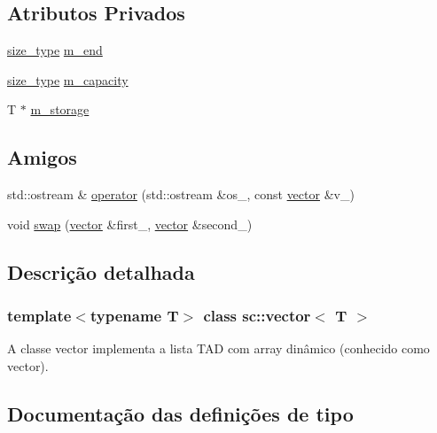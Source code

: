\subsection*{Atributos Privados}
\begin{DoxyCompactItemize}
\item 
\hyperlink{classsc_1_1vector_a48bf37ba1a6d0c13504414d86e27c399}{size\+\_\+type} \hyperlink{classsc_1_1vector_a6975f68db056a83f00912e9f986ca084}{m\+\_\+end}
\item 
\hyperlink{classsc_1_1vector_a48bf37ba1a6d0c13504414d86e27c399}{size\+\_\+type} \hyperlink{classsc_1_1vector_a566372683113653e90132001ddec8baa}{m\+\_\+capacity}
\item 
T $\ast$ \hyperlink{classsc_1_1vector_a1703231d2a20b42fd2814962310baf1d}{m\+\_\+storage}
\end{DoxyCompactItemize}
\subsection*{Amigos}
\begin{DoxyCompactItemize}
\item 
std\+::ostream \& \hyperlink{classsc_1_1vector_a889e37c4415a33fb90d8b564bf428e24}{operator} (std\+::ostream \&os\+\_\+, const \hyperlink{classsc_1_1vector}{vector} \&v\+\_\+)
\item 
void \hyperlink{classsc_1_1vector_a9198beeb05f24ba2eadccab0a606063c}{swap} (\hyperlink{classsc_1_1vector}{vector} \&first\+\_\+, \hyperlink{classsc_1_1vector}{vector} \&second\+\_\+)
\end{DoxyCompactItemize}


\subsection{Descrição detalhada}
\subsubsection*{template$<$typename T$>$\newline
class sc\+::vector$<$ T $>$}

A classe vector implementa a lista T\+AD com array dinâmico (conhecido como vector). 

\subsection{Documentação das definições de tipo}
\mbox{\label{classsc_1_1vector_a1e50aa429ea9de6ead4bfdb8614c1c9a}} 
